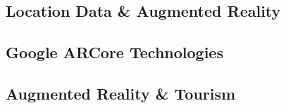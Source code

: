 \subsection{Location Data \&  Augmented Reality}
\subsection{Google ARCore Technologies}
\subsection{Augmented Reality \& Tourism}